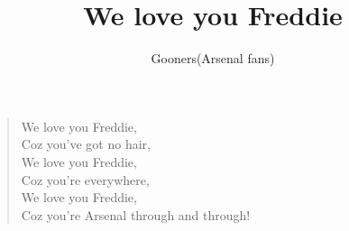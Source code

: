 \documentclass[a4paper,12pt]{article}
\title{We love you Freddie}
\author{Gooners(Arsenal fans)}
\date{}
\begin{document}
	
	\maketitle
	
	\begin{verse}
		
		We love you Freddie, \\
		Coz you've got no hair, \\
		We love you Freddie, \\
		Coz you're everywhere, \\
		We love you Freddie, \\
		Coz you're Arsenal through and through!
		
	\end{verse}
	
\end{document}
